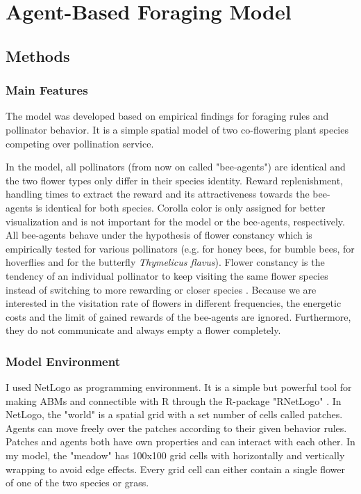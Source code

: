 
\newpage
\section{Agent-Based Foraging Model}

\subsection{Methods}

\subsubsection*{Main Features} %
The model was developed based on empirical findings for foraging rules and pollinator behavior.  It is a simple spatial model of two co-flowering plant species competing over pollination service. 

In the model, all pollinators (from now on called "bee-agents") are identical and the two flower types only differ in their species identity. Reward replenishment, handling times to extract the reward and its attractiveness towards the bee-agents is identical for both species. Corolla color is only assigned for better visualization and is not important for the model or the bee-agents, respectively. All bee-agents behave under the hypothesis of flower constancy which is empirically tested for various pollinators (e.g. \citet{hill1997spontaneous} for honey bees, \citet{chittka1997foraging} for bumble bees, \citet{goulson1998flower} for hoverflies and \citet{goulson1997foraging} for the butterfly \textit{Thymelicus flavus}). Flower constancy is the tendency of an individual pollinator to keep visiting the same flower species instead of switching to more rewarding or closer species \citep{chittka1999flower,waser1986flower}. Because we are interested in the visitation rate of flowers in different frequencies, the energetic costs and the limit of gained rewards of the bee-agents are ignored. Furthermore, they do not communicate and always empty a flower completely. 

\subsubsection*{Model Environment}
I used NetLogo \citep{wilensky1999netlogo} as programming environment. It is a simple but powerful tool for making ABMs and connectible with R through the R-package "RNetLogo" \citep{thiele2014r}. In NetLogo, the "world" is a spatial grid with a set number of cells called patches. Agents can move freely over the patches according to their given behavior rules. Patches and agents both have own properties and can interact with each other. 
In my model, the "meadow" has 100x100 grid cells with horizontally and vertically wrapping to avoid edge effects. Every grid cell can either contain a single flower of one of the two species or grass. 

